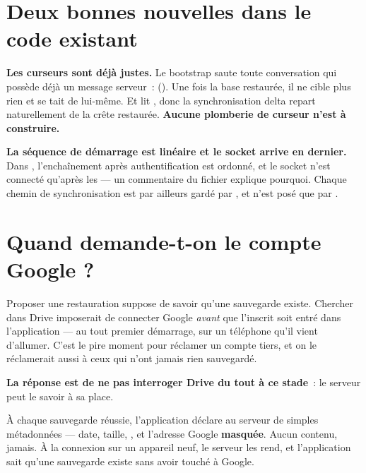 \documentclass[11pt,a4paper,oneside]{report}
\begin{document}
\section{Deux bonnes nouvelles dans le code existant}

\begin{constat}
\textbf{Les curseurs sont déjà justes.} Le bootstrap saute toute conversation qui possède
déjà un message serveur~: 
(). Une fois la base restaurée, il ne cible plus rien et se tait
de lui-même. Et  lit , donc la
synchronisation delta repart naturellement de la crête restaurée. \textbf{Aucune plomberie de
curseur n'est à construire.}
\end{constat}

\begin{constat}
\textbf{La séquence de démarrage est linéaire et le socket arrive en dernier.} Dans
, l'enchaînement après authentification est ordonné, et le socket n'est
connecté qu'après les  --- un commentaire du fichier explique pourquoi. Chaque
chemin de synchronisation est par ailleurs gardé par , et
 n'est posé que par .
\end{constat}

\section{Quand demande-t-on le compte Google ?}
\label{sec:quand-google}

Proposer une restauration suppose de savoir qu'une sauvegarde existe. Chercher dans Drive
imposerait de connecter Google \emph{avant} que l'inscrit soit entré dans l'application ---
au tout premier démarrage, sur un téléphone qu'il vient d'allumer. C'est le pire moment pour
réclamer un compte tiers, et on le réclamerait aussi à ceux qui n'ont jamais rien
sauvegardé.

\textbf{La réponse est de ne pas interroger Drive du tout à ce stade}~: le serveur peut le
savoir à sa place.

À chaque sauvegarde réussie, l'application déclare au serveur de simples métadonnées --- date,
taille, , et l'adresse Google \textbf{masquée}. Aucun contenu, jamais. À la
connexion sur un appareil neuf, le serveur les rend, et l'application sait qu'une sauvegarde
existe sans avoir touché à Google.
\end{document}
